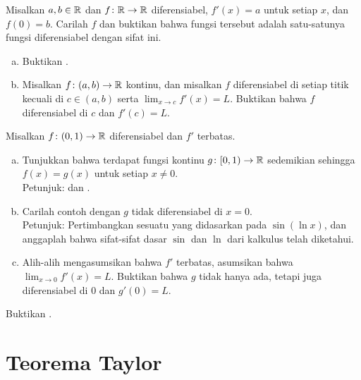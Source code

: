 \begin{exercise}
Misalkan $a,b \in {\mathbb{R}}$ dan $f \colon {\mathbb{R}} \to {\mathbb{R}}$ diferensiabel,
$f'(x) = a$ untuk setiap $x$, dan $f(0) = b$.  Carilah $f$ dan buktikan bahwa 
fungsi tersebut adalah satu-satunya fungsi diferensiabel dengan sifat ini.
\end{exercise}

\begin{exercise} \label{exercise:endpointderivative}
\leavevmode
\begin{enumerate}[a)]
\item
Buktikan .
\item 
Misalkan $f \colon (a,b) \to {\mathbb{R}}$ kontinu, dan misalkan $f$ diferensiabel di setiap titik kecuali di $c \in
(a,b)$ serta $\lim_{x \to c} f'(x) = L$.
Buktikan bahwa $f$ diferensiabel di
$c$ dan $f'(c) = L$.
\end{enumerate}
\end{exercise}

\begin{exercise} \label{exercise:extendboundedder}
Misalkan $f \colon (0,1) \to {\mathbb{R}}$ diferensiabel dan $f'$
terbatas.
\begin{enumerate}[a)]
\item
Tunjukkan bahwa terdapat fungsi kontinu $g \colon [0,1) \to {\mathbb{R}}$
sedemikian sehingga $f(x) = g(x)$ untuk setiap $x \neq 0$.\\
Petunjuk:  dan
.
\item
Carilah contoh dengan $g$ tidak diferensiabel di $x=0$.
\\
Petunjuk: Pertimbangkan sesuatu yang didasarkan pada $\sin(\ln x)$,
dan anggaplah bahwa sifat-sifat dasar
$\sin$ dan $\ln$ dari kalkulus telah diketahui.
\item
Alih-alih mengasumsikan bahwa $f'$ terbatas, asumsikan bahwa $\lim_{x \to 0} f'(x)
= L$.  Buktikan bahwa $g$ tidak hanya ada, tetapi juga diferensiabel di $0$
dan $g'(0) = L$.
\end{enumerate}
\end{exercise}

\begin{exercise}
Buktikan .
\end{exercise}


\sectionnewpage
\section{Teorema Taylor}
\label{sec:taylor}

